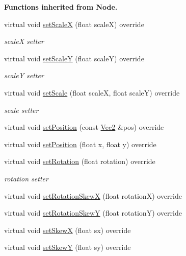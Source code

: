 \begin{Indent}\textbf{ Functions inherited from Node.}\par
\begin{DoxyCompactItemize}
\item 
virtual void \hyperlink{classSprite_a94c2d64bfcfd193f6b9ec927f9bb44b7}{set\+ScaleX} (float scaleX) override
\begin{DoxyCompactList}\small\item\em scaleX setter \end{DoxyCompactList}\item 
virtual void \hyperlink{classSprite_a167e418b057071cbaf57f75f7c88c9df}{set\+ScaleY} (float scaleY) override
\begin{DoxyCompactList}\small\item\em scaleY setter \end{DoxyCompactList}\item 
virtual void \hyperlink{classSprite_aa91d58969ba99f1bfd3ade56bda6fc5c}{set\+Scale} (float scaleX, float scaleY) override
\begin{DoxyCompactList}\small\item\em scale setter \end{DoxyCompactList}\item 
virtual void \hyperlink{classSprite_aace7c480af3721709b218bdc579f8903}{set\+Position} (const \hyperlink{classVec2}{Vec2} \&pos) override
\item 
virtual void \hyperlink{classSprite_ad6ceb4be9c4664798908bb0f8dd3bf70}{set\+Position} (float x, float y) override
\item 
virtual void \hyperlink{classSprite_a943f5aa94fccc46930b978d291ff0cfe}{set\+Rotation} (float rotation) override
\begin{DoxyCompactList}\small\item\em rotation setter \end{DoxyCompactList}\item 
virtual void \hyperlink{classSprite_a8fe7bd093a18a2245c230b96f2c59897}{set\+Rotation\+SkewX} (float rotationX) override
\item 
virtual void \hyperlink{classSprite_a7ed528b143e0a099f143bc1dbb39cdb1}{set\+Rotation\+SkewY} (float rotationY) override
\item 
virtual void \hyperlink{classSprite_ae6ad4d3c0f8be8d4ac45a0c1f8012896}{set\+SkewX} (float sx) override
\item 
virtual void \hyperlink{classSprite_ab1d4bdeffe2b1fa8720481316123316a}{set\+SkewY} (float sy) override
\item 

\end{DoxyCompactItemize}
\end{Indent}
